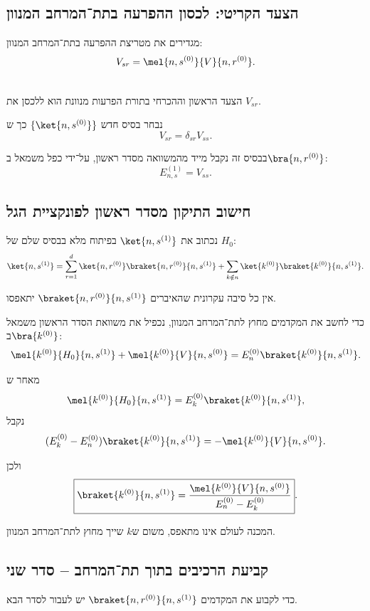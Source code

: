 \subsection{הצעד הקריטי: לכסון ההפרעה בתת־המרחב המנוון}

מגדירים את מטריצת ההפרעה בתת־המרחב המנוון:
\[
V_{sr} = \mel{n,s^{(0)}}{V}{n,r^{(0)}}.
\]

\begin{resultbox}
\\
הצעד הראשון וההכרחי בתורת הפרעות מנוונת הוא ללכסן את $V_{sr}$.
\end{resultbox}

נבחר בסיס חדש $\{\ket{n,s^{(0)}}\}$ כך ש
\[
V_{sr} = \delta_{sr} V_{ss}.
\]

בבסיס זה נקבל מייד מהמשוואה מסדר ראשון, על־ידי כפל משמאל ב$\bra{n,r^{(0)}}$:
\[
E_{n,s}^{(1)} = V_{ss}.
\]



\subsection{חישוב התיקון מסדר ראשון לפונקציית הגל}

נכתוב את $\ket{n,s^{(1)}}$ בפיתוח מלא בבסיס שלם של $H_0$:
\[
\ket{n,s^{(1)}} =
\sum_{r=1}^d \ket{n,r^{(0)}} \braket{n,r^{(0)}}{n,s^{(1)}}
+
\sum_{k\notin n} \ket{k^{(0)}} \braket{k^{(0)}}{n,s^{(1)}}.
\]

אין כל סיבה עקרונית שהאיברים $\braket{n,r^{(0)}}{n,s^{(1)}}$ יתאפסו.

כדי לחשב את המקדמים מחוץ לתת־המרחב המנוון, נכפיל את משוואת הסדר הראשון משמאל ב$\bra{k^{(0)}}$:
\[
\mel{k^{(0)}}{H_0}{n,s^{(1)}} + \mel{k^{(0)}}{V}{n,s^{(0)}}
=
E_n^{(0)} \braket{k^{(0)}}{n,s^{(1)}}.
\]

מאחר ש
\[
\mel{k^{(0)}}{H_0}{n,s^{(1)}} = E_k^{(0)} \braket{k^{(0)}}{n,s^{(1)}},
\]
נקבל
\[
(E_k^{(0)} - E_n^{(0)}) \braket{k^{(0)}}{n,s^{(1)}}
=
-\mel{k^{(0)}}{V}{n,s^{(0)}}.
\]

ולכן
\[
\boxed{
\braket{k^{(0)}}{n,s^{(1)}} =
\frac{\mel{k^{(0)}}{V}{n,s^{(0)}}}{E_n^{(0)} - E_k^{(0)}}
}.
\]

המכנה לעולם אינו מתאפס, משום ש$k$ שייך מחוץ לתת־המרחב המנוון.



\subsection{קביעת הרכיבים בתוך תת־המרחב – סדר שני}

כדי לקבוע את המקדמים $\braket{n,r^{(0)}}{n,s^{(1)}}$ יש לעבור לסדר הבא.

